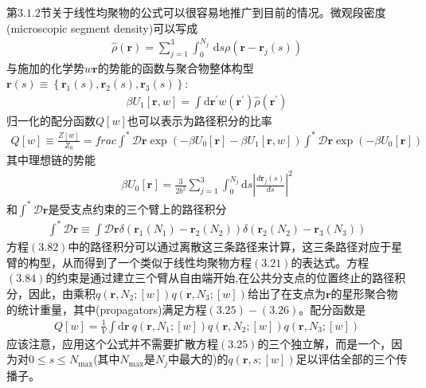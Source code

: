 第$3.1.2$节关于线性均聚物的公式可以很容易地推广到目前的情况。微观段密度(microscopic segment density)可以写成
\begin{gather}
\hat{\rho}(\mathbf{r})=\sum_{j=1}^3 \int_{0}^{N_j}\, \mathrm{d}s\rho(\mathbf{r}-\mathbf{r}_{j}(s))
\end{gather}
与施加的化学势$w \mathbf{r}$的势能的函数与聚合物整体构型$\mathbf{r}(s)\equiv \left\{ \mathbf{r}_1(s),\mathbf{r}_2(s),\mathbf{r}_3(s) \right\}:$
\begin{gather}
\beta U_1[\mathbf{r},w]=\int \mathrm{d}\mathbf{r}^{'}w(\mathbf{r}^{'})\hat{\rho}(\mathbf{r}^{'})
\end{gather}
归一化的配分函数$Q[w]$也可以表示为路径积分的比率
\begin{gather}
Q[w]\equiv \frac{Z[w]}{Z_0}=frac{\int^{*}\mathcal{D}\mathbf{r}\exp (-\beta U_0[\mathbf{r}]-\beta U_1[\mathbf{r},w])}{\int^{*}\mathcal{D}\mathbf{r}\exp (-\beta U_0[\mathbf{r}])}
\end{gather}
其中理想链的势能
\begin{gather}
\beta U_0[\mathbf{r}]=\frac{3}{2b^2}\sum_{j=1}^3\int_{0}^{N_j} \mathrm{d}s\left| \frac{d\mathbf{r}_j(s)}{ds} \right|^2
\end{gather}
和$\int^{*}\mathcal{D}\mathbf{r}$是受支点约束的三个臂上的路径积分
\begin{gather}
\int^{*}\mathcal{D}\mathbf{r}\equiv \int \mathcal{D}\mathbf{r}\delta (\mathbf{r}_1(N_1)-\mathbf{r}_2(N_2))\delta (\mathbf{r}_2(N_2)-\mathbf{r}_3(N_3))
\end{gather}
方程$(3.82)$中的路径积分可以通过离散这三条路径来计算，这三条路径对应于星臂的构型，从而得到了一个类似于线性均聚物方程$(3.21)$的表达式。方程$(3.84)$的约束是通过建立三个臂从自由端开始,在公共分支点的位置终止的路径积分，因此，由乘积$q(\mathbf{r},N_2;[w])q(\mathbf{r},N_3;[w])$给出了在支点为$\mathbf{r}$的星形聚合物的统计重量，其中(propagators)满足方程$(3.25)-(3.26)$。配分函数是
\begin{gather}
Q[w]=\frac{1}{V}\int \mathrm{d}\mathbf{r}~q(\mathbf{r},N_1;[w])q(\mathbf{r},N_2;[w])q(\mathbf{r},N_3;[w])
\end{gather}
应该注意，应用这个公式并不需要扩散方程$(3.25)$的三个独立解，而是一个，因为对$0\leq s\leq N_{\max}$(其中$N_{\max}$是$N_j$中最大的)的$q(\mathbf{r},s;[w])$足以评估全部的三个传播子。

